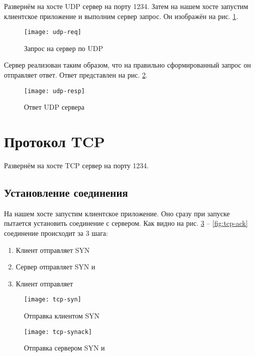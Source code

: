 Развернём на хосте  UDP сервер на порту 1234. Затем на нашем хосте  запустим клиентское приложение и выполним сервер запрос. Он изображён на рис. \ref{fig:udp-req}.

\begin{figure}[H]
	\centering
	\texttt{[image: udp-req]}
	\caption{Запрос на сервер по UDP}
	\label{fig:udp-req}
\end{figure}

Сервер реализован таким образом, что на правильно сформированный запрос он отправляет ответ. Ответ представлен на рис. \ref{fig:udp-resp}.

\begin{figure}[H]
	\centering
	\texttt{[image: udp-resp]}
	\caption{Ответ UDP сервера}
	\label{fig:udp-resp}
\end{figure}

\section{Протокол TCP}

Развернём на хосте  TCP сервер на порту 1234. 

\subsection{Установление соединения}

На нашем хосте  запустим клиентское приложение. Оно сразу при запуске пытается установить соединение с сервером. Как видно на рис. \ref{fig:tcp-syn} -- \ref{fig:tcp-ack} соединение происходит за 3 шага:

\begin{enumerate}
	\item Клиент отправляет SYN
	\item Сервер отправляет SYN и 
	\item Клиент отправляет 
\end{enumerate}

\begin{figure}[H]
	\centering
	\texttt{[image: tcp-syn]}
	\caption{Отправка клиентом SYN}
	\label{fig:tcp-syn}
\end{figure}

\begin{figure}[H]
	\centering
	\texttt{[image: tcp-synack]}
	\caption{Отправка сервером SYN и }
	\label{fig:tcp-synack}
\end{figure}


